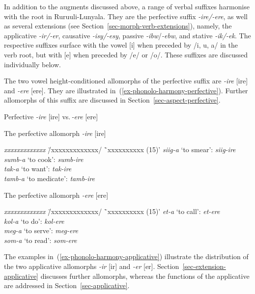 In addition to the augments discussed above, a range of verbal suffixes harmonise with the root in Ru\-ruu\-li-Lunyala. 
They are the perfective suffix \textit{-ire/-ere}, as well as several extensions (see Section~\ref{sec-morph-verb-extensions}), namely, the applicative \textit{-ir/-er}, causative \textit{-isy/-esy}, passive \mbox{\textit{-ibw}/}\mbox{\textit{-ebw},} and stative \textit{-ik/-ek}. 
The respective suffixes surface with the vowel [i] when preceded by /i, u, a/ in the verb root, but with [e] when preceded by /e/ or /o/. 
These suffixes are discussed individually below.

The two vowel height-conditioned allomorphs of the perfective suffix are \textit{-ire} [ire] and \textit{-ere} [ere]. They are illustrated in~(\ref{ex-phonolo-harmony-perfective}). 
Further allomorphs of this suffix are discussed in Section~\ref{sec-aspect-perfective}.

\ea \label{ex-phonolo-harmony-perfective}
Perfective \textit{-ire} [ire] vs.\,\textit{-ere} [ere]
\begin{xlist}

\ex The perfective allomorph \textit{-ire} [ire]
\begin{tabbing}
 \textit{xxxxxxxxxxxxx} \= /xxxxxxxxxxxxx/ \=`xxxxxxxxxx (15)'\kill
	  \textit{siig-a} \> `to smear':	\>  \textit{siig-ire}\\
	  \textit{sumb-a}\> 	`to cook':	\>  \textit{sumb-ire}\\
	  \textit{tak-a}	\>  `to want':	\>   \textit{tak-ire}\\
	  \textit{tamb-a}	\>  `to medicate':\> 	  \textit{tamb-ire}\\
\end{tabbing}	

\ex	The perfective allomorph \textit{-ere} [ere]
\begin{tabbing}
 	 \textit{xxxxxxxxxxxxx} \= /xxxxxxxxxxxxx/ \=`xxxxxxxxxx (15)'\kill
	 \textit{et-a} \> `to call':	\> \textit{et-ere}\\
	 \textit{kol-a} \>`to do': \> \textit{kol-ere}\\
	 \textit{meg-a} \>`to serve':\>   \textit{meg-ere}\\
	 \textit{som-a} \>`to read': \> \textit{som-ere}
	\end{tabbing}	
\end{xlist}
\z

The examples in~(\ref{ex-phonolo-harmony-applicative}) illustrate the distribution of the two applicative allomorphs \textit{-ir} [ir] and \textit{-er} [er]. Section~\ref{sec-extension-applicative} discusses further allomorphs, whereas the functions of the applicative are addressed in Section~\ref{sec-applicative}.

